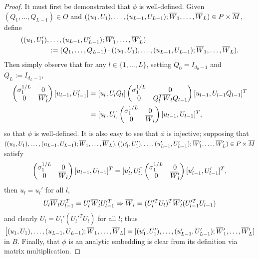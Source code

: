 \documentclass{article}
\newcommand{\bW}{\smash{\overline{W}}\vphantom{W}}
\newcommand{\bM}{\overline{M}}
\theoremstyle{plain}
\theoremstyle{definition}
\theoremstyle{remark}
\begin{document}
\begin{proof}
    It must first be demonstrated that $\phi$ is well-defined. Given $(Q_1,\dots,Q_{L-1})\in O$ and $((u_1,U_1),\dots,(u_{L-1},U_{L-1});\bW_1,\dots,\bW_L)\in P\times\bM$, define
    \begin{align}
    ((u_1,U_1'),&\dots,(u_{L-1},U_{L-1}');\bW_1',\dots,\bW_L')\\&:=(Q_1,\dots,Q_{L-1})\cdot ((u_1,U_1),\dots,(u_{L-1},U_{L-1});\bW_1,\dots,\bW_L).
    \end{align}
    Then simply observe that for any $l\in\{1,\dots,L\}$, setting $Q_0 = I_{d_0-1}$ and $Q_L:=I_{d_L-1}$,
    \begin{align}
    [u_l,U_l']\begin{pmatrix}\sigma_1^{1/L} & 0 \\ 0 & \bW_l'\end{pmatrix}[u_{l-1},U_{l-1}'] &= [u_l,U_lQ_l]\begin{pmatrix} \sigma_1^{1/L} & 0 \\ 0 & Q_l^T\bW_l Q_{l-1}\end{pmatrix}[u_{l-1},U_{l-1}Q_{l-1}]^T\\&=[u_l,U_l]\begin{pmatrix} \sigma_1^{1/L} & 0 \\ 0 & \bW_l\end{pmatrix}[u_{l-1},U_{l-1}]^T,
    \end{align}
    so that $\phi$ is well-defined. It is also easy to see that $\phi$ is injective; supposing that $((u_1,U_1),\dots,(u_{L-1},U_{L-1});\bW_1,\dots,\bW_L),((u_1',U_1'),\dots,(u_{L-1}',U_{L-1}');\bW_1',\dots,\bW_L')\in P\times\bM$ satisfy
    \begin{align}
    [u_l,U_l]\begin{pmatrix} \sigma_1^{1/L} & 0 \\ 0 & \bW_l\end{pmatrix}[u_{l-1},U_{l-1}]^T = [u_l',U_l']\begin{pmatrix} \sigma_1^{1/L} & 0 \\ 0 & \bW_l'\end{pmatrix}[u_{l-1}',U_{l-1}']^T,
    \end{align}
    then $u_l = u_l'$ for all $l$,
    \begin{align}
    U_l\bW_lU_{l-1}^T  = U_l'\bW_l'U_{l-1}'^T\Rightarrow \bW_l = (U_l'^TU_l)^T\bW_l'(U_{l-1}'^TU_{l-1})
    \end{align}
    and clearly $U_l = U_l'(U_l'^TU_l)$ for all $l$; thus $\big[(u_1,U_1),\dots,(u_{L-1},U_{L-1});\bW_1,\dots,\bW_L] = [(u_1',U_1'),\dots,(u_{L-1}',U_{L-1}');\bW_1',\dots,\bW_L']$ in $B$. Finally, that $\phi$ is an analytic embedding is clear from its definition via matrix multiplication. 


\end{proof}
\end{document}
